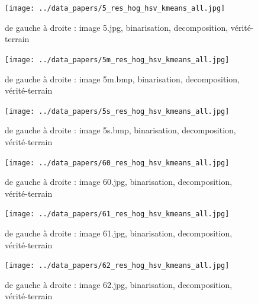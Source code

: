 \documentclass{book}
\begin{document}
\begin{figure}[H]
\begin{center}
\texttt{[image: ../data\_papers/5\_res\_hog\_hsv\_kmeans\_all.jpg]}
\end{center}
\caption{de gauche à droite : image 5.jpg, binarisation, decomposition, vérité-terrain}
\label{5}
\end{figure}
\clearpage


\begin{figure}[H]
\begin{center}
\texttt{[image: ../data\_papers/5m\_res\_hog\_hsv\_kmeans\_all.jpg]}
\end{center}
\caption{de gauche à droite : image 5m.bmp, binarisation, decomposition, vérité-terrain}
\label{5m}
\end{figure}
\clearpage


\begin{figure}[H]
\begin{center}
\texttt{[image: ../data\_papers/5s\_res\_hog\_hsv\_kmeans\_all.jpg]}
\end{center}
\caption{de gauche à droite : image 5s.bmp, binarisation, decomposition, vérité-terrain}
\label{5s}
\end{figure}
\clearpage


\begin{figure}[H]
\begin{center}
\texttt{[image: ../data\_papers/60\_res\_hog\_hsv\_kmeans\_all.jpg]}
\end{center}
\caption{de gauche à droite : image 60.jpg, binarisation, decomposition, vérité-terrain}
\label{60}
\end{figure}
\clearpage


\begin{figure}[H]
\begin{center}
\texttt{[image: ../data\_papers/61\_res\_hog\_hsv\_kmeans\_all.jpg]}
\end{center}
\caption{de gauche à droite : image 61.jpg, binarisation, decomposition, vérité-terrain}
\label{61}
\end{figure}
\clearpage


\begin{figure}[H]
\begin{center}
\texttt{[image: ../data\_papers/62\_res\_hog\_hsv\_kmeans\_all.jpg]}
\end{center}
\caption{de gauche à droite : image 62.jpg, binarisation, decomposition, vérité-terrain}
\label{62}
\end{figure}
\clearpage
\end{document}
